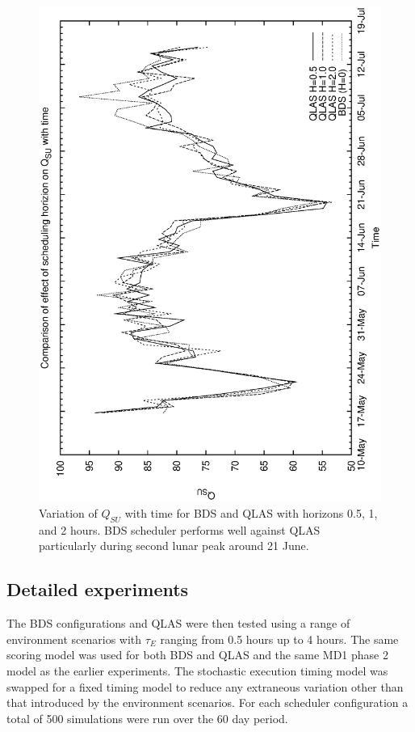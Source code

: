 \begin{figure}[htp]
\begin{center}
  \includegraphics[scale=0.5, angle=-90]{figures/qsa3_su.eps}
  \caption[Variation of $Q_{SU}$ with time for QLAS horizons.]
  {Variation of $Q_{SU}$ with time for BDS and  QLAS with horizons 0.5, 1, and 2 hours. BDS scheduler performs well against QLAS particularly during second lunar peak around 21 June.}
\label{fig:ensemble_qlas_su}
\end{center}
\end{figure}


\subsection{Detailed experiments}
The BDS configurations and QLAS were then tested using a range of environment scenarios with $\tau_E$ ranging from 0.5 hours up to 4 hours. The same scoring model was used for both BDS and QLAS and the same MD1 phase 2 model as the earlier experiments. The stochastic execution timing model was swapped for a fixed timing model to reduce any extraneous variation other than that introduced by the environment scenarios. For each scheduler configuration a total of 500 simulations were run over the 60 day period.

